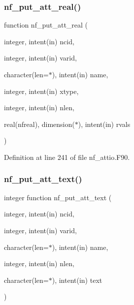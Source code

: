 \mbox{\label{nf__attio_8F90_ad80e732c2596e52974c07adbf3a9e8a9}} 
\subsubsection{\texorpdfstring{nf\+\_\+put\+\_\+att\+\_\+real()}{nf\_put\_att\_real()}}
{\footnotesize\ttfamily function nf\+\_\+put\+\_\+att\+\_\+real (\begin{DoxyParamCaption}\item[{integer, intent(in)}]{ncid,  }\item[{integer, intent(in)}]{varid,  }\item[{character(len=$\ast$), intent(in)}]{name,  }\item[{integer, intent(in)}]{xtype,  }\item[{integer, intent(in)}]{nlen,  }\item[{real(nfreal), dimension($\ast$), intent(in)}]{rvals }\end{DoxyParamCaption})}



Definition at line 241 of file nf\+\_\+attio.\+F90.

\mbox{\label{nf__attio_8F90_a1a21947585dcb6201aefedb36a038b6a}} 
\subsubsection{\texorpdfstring{nf\+\_\+put\+\_\+att\+\_\+text()}{nf\_put\_att\_text()}}
{\footnotesize\ttfamily integer function nf\+\_\+put\+\_\+att\+\_\+text (\begin{DoxyParamCaption}\item[{integer, intent(in)}]{ncid,  }\item[{integer, intent(in)}]{varid,  }\item[{character(len=$\ast$), intent(in)}]{name,  }\item[{integer, intent(in)}]{nlen,  }\item[{character(len=$\ast$), intent(in)}]{text }\end{DoxyParamCaption})}



